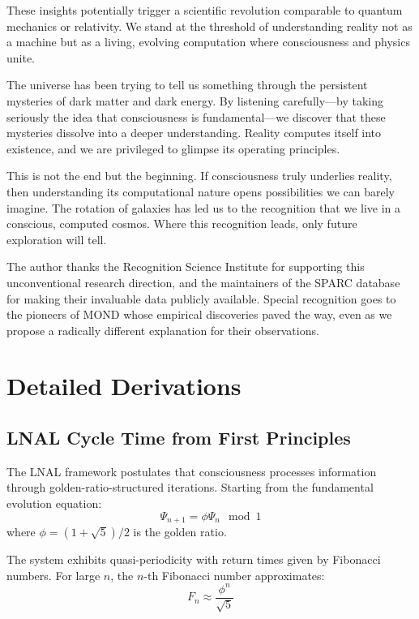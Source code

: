 \documentclass[twocolumn,prd,amsmath,amssymb,aps,superscriptaddress,nofootinbib]{revtex4-2}
\begin{document}
These insights potentially trigger a scientific revolution comparable to quantum mechanics or relativity. We stand at the threshold of understanding reality not as a machine but as a living, evolving computation where consciousness and physics unite.

The universe has been trying to tell us something through the persistent mysteries of dark matter and dark energy. By listening carefully---by taking seriously the idea that consciousness is fundamental---we discover that these mysteries dissolve into a deeper understanding. Reality computes itself into existence, and we are privileged to glimpse its operating principles.

This is not the end but the beginning. If consciousness truly underlies reality, then understanding its computational nature opens possibilities we can barely imagine. The rotation of galaxies has led us to the recognition that we live in a conscious, computed cosmos. Where this recognition leads, only future exploration will tell.

\acknowledgments

The author thanks the Recognition Science Institute for supporting this unconventional research direction, and the maintainers of the SPARC database for making their invaluable data publicly available. Special recognition goes to the pioneers of MOND whose empirical discoveries paved the way, even as we propose a radically different explanation for their observations.

\appendix

\section{Detailed Derivations}
\label{app:derivations}

\subsection{LNAL Cycle Time from First Principles}

The LNAL framework postulates that consciousness processes information through golden-ratio-structured iterations. Starting from the fundamental evolution equation:
\begin{equation}
\Psi_{n+1} = \phi \Psi_n \mod 1
\end{equation}
where $\phi = (1+\sqrt{5})/2$ is the golden ratio.

The system exhibits quasi-periodicity with return times given by Fibonacci numbers. For large $n$, the $n$-th Fibonacci number approximates:
\begin{equation}
F_n \approx \frac{\phi^n}{\sqrt{5}}
\end{equation}
\end{document}
